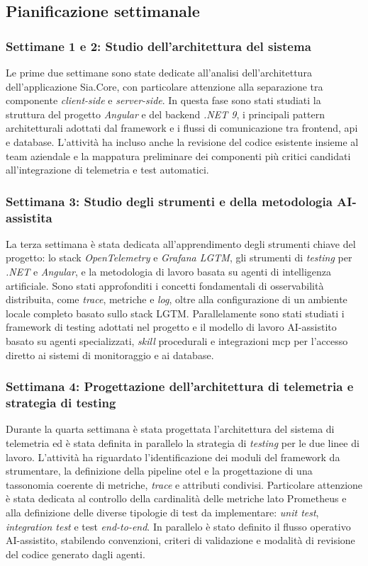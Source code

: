 \subsection{Pianificazione settimanale}

\subsubsection*{Settimane 1 e 2: Studio dell’architettura del sistema}
Le prime due settimane sono state dedicate all’analisi dell’architettura dell’applicazione Sia.Core, con particolare attenzione alla separazione tra componente \emph{client-side} e \emph{server-side}.
In questa fase sono stati studiati la struttura del progetto \emph{Angular} e del backend \emph{.NET 9}, i principali pattern architetturali adottati dal framework e i flussi di comunicazione tra frontend, \gls{api} e database.
L’attività ha incluso anche la revisione del codice esistente insieme al team aziendale e la mappatura preliminare dei componenti più critici candidati all’integrazione di telemetria e test automatici.

\subsubsection*{Settimana 3: Studio degli strumenti e della metodologia AI-assistita}
La terza settimana è stata dedicata all'apprendimento degli strumenti chiave del progetto: lo stack \emph{OpenTelemetry} e \emph{Grafana LGTM}, gli strumenti di \emph{testing} per \emph{.NET} e \emph{Angular}, e la metodologia di lavoro basata su agenti di intelligenza artificiale.
Sono stati approfonditi i concetti fondamentali di osservabilità distribuita, come \emph{trace}, metriche e \emph{log}, oltre alla configurazione di un ambiente locale completo basato sullo stack LGTM.
Parallelamente sono stati studiati i framework di testing adottati nel progetto e il modello di lavoro AI-assistito basato su agenti specializzati, \emph{skill} procedurali e integrazioni \gls{mcp} per l’accesso diretto ai sistemi di monitoraggio e ai database.

\subsubsection*{Settimana 4: Progettazione dell'architettura di telemetria e strategia di testing}
Durante la quarta settimana è stata progettata l'architettura del sistema di telemetria ed è stata definita in parallelo la strategia di \emph{testing} per le due linee di lavoro.
L’attività ha riguardato l’identificazione dei moduli del framework da strumentare, la definizione della pipeline \gls{otel} e la progettazione di una tassonomia coerente di metriche, \emph{trace} e attributi condivisi.
Particolare attenzione è stata dedicata al controllo della cardinalità delle metriche lato Prometheus e alla definizione delle diverse tipologie di test da implementare: \emph{unit test}, \emph{integration test} e test \emph{end-to-end}.
In parallelo è stato definito il flusso operativo AI-assistito, stabilendo convenzioni, criteri di validazione e modalità di revisione del codice generato dagli agenti.

